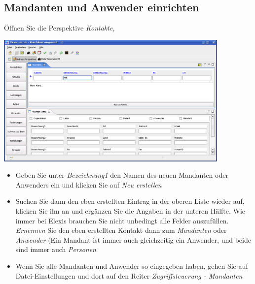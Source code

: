 \subsection{Mandanten und Anwender einrichten}
Öffnen Sie die Perspektive \textit{Kontakte},

\includegraphics[width=4.5in]{images/grundkonfkonta.png}
\begin{itemize}
 \item Geben Sie unter \textit{Bezeichnung1} den Namen des neuen Mandanten oder Anwenders ein und klicken Sie auf \textit{Neu erstellen}
 \item Suchen Sie dann den eben erstellten Eintrag in der oberen Liste wieder auf, klicken Sie ihn an und ergänzen Sie die Angaben in der unteren Hälfte. Wie immer bei Elexis brauchen Sie nicht unbedingt alle Felder auszufüllen. \textit{Ernennen} Sie den eben erstellten Kontakt dann zum \textit{Mandanten} oder \textit{Anwender} (Ein Mandant ist immer auch gleichzeitig ein Anwender, und beide sind immer auch \textit{Personen}
 \item Wenn Sie alle Mandanten und Anwender so eingegeben haben, gehen Sie auf Datei-Einstellungen und dort auf den Reiter \textit{Zugriffsteuerung - Mandanten}
\end{itemize}

